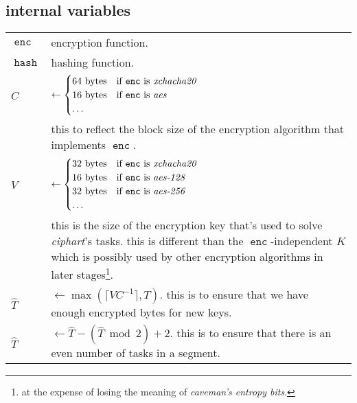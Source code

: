 \documentclass[twocolumn]{article}
\DeclareMathOperator{\enc}{\mathtt{enc}}
\DeclareMathOperator{\maxf}{max}
\DeclareMathOperator{\hash}{\mathtt{hash}}
\begin{document}
\subsection{internal variables}
\begin{tabularx}{\columnwidth}{lX}
    $\enc$ & encryption function.\\
    $\hash$ & hashing function.\\
    $C$         & $\gets \begin{cases}
                        64 \text{ bytes} & \text{if $\enc$ is
                                            \emph{xchacha20}}\\
                        16 \text{ bytes} & \text{if $\enc$ is \emph{aes}}\\
                        \ldots & \\
                     \end{cases}$\\
                & this to reflect the block size of the encryption
                    algorithm that implements $\enc$.\\
    $V$ & $\gets \begin{cases}
                        32 \text{ bytes} & \text{if $\enc$ is
                                            \emph{xchacha20}}\\
                        16 \text{ bytes} & \text{if $\enc$ is
                            \emph{aes-128}}\\
                        32 \text{ bytes} & \text{if $\enc$ is
                            \emph{aes-256}}\\
                        \ldots & \\
                     \end{cases}$\\
                & this is the size of the encryption key that's used to
                    solve \emph{ciphart}'s tasks.  this is different than
                    the $\enc$-independent $K$ which is
                    possibly used by other encryption algorithms in later
                    stages\footnote{at the expense of losing the meaning of
                    \emph{caveman's entropy bits}.}.\\
    $\hat T$    & $\gets \maxf(\lceil V C^{-1}\rceil, T)$.  this
                    is to ensure that we have enough encrypted bytes for
                    new keys.\\
    $\hat T$    & $\gets \hat T - (\hat T \bmod 2) + 2$.  this is to ensure
                    that there is an even number of tasks in a segment.

\end{tabularx}
\end{document}
